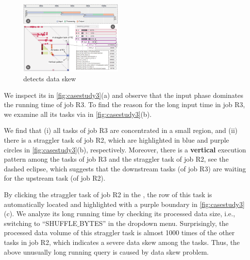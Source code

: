 \begin{figure}[t]
	\centering
	\small
	\includegraphics[width=0.46\textwidth]{figures/case_study/CaseStudy3SDS.pdf}
	\vspace{-2mm}
	\caption{\qevis{} detects data skew}
	\label{fig:casestudy3}
	\vspace{-5mm}
\end{figure}


We inspect its  in \autoref{fig:casestudy3}(a) and observe that the input phase dominates the running time of job R3.
To find the reason for the long input time in job R3, we examine all its tasks via  in \autoref{fig:casestudy3}(b).


We find that (i) all tasks of job R3 are concentrated in a small region, and (ii) there is a straggler task of job R2, which are highlighted in blue and purple circles in \autoref{fig:casestudy3}(b), respectively.
Moreover, there is a \textbf{vertical} execution pattern among the tasks of job R3 and the straggler task of job R2,
see the dashed eclipse, which suggests that the downstream tasks (of job R3) are waiting for the upstream task (of job R2).

By clicking the straggler task of job R2 in the , the row of this task is automatically located and highlighted with a purple boundary in \autoref{fig:casestudy3}(c). 
We analyze its long running time by checking its processed data size, i.e., switching to ``SHUFFLE$\_$BYTES'' in the dropdown menu.
Surprisingly, the processed data volume of this straggler task is almost 1000 times of the other tasks in job R2, which indicates a severe data skew among the tasks.
Thus, the above unusually long running query is caused by data skew problem.

